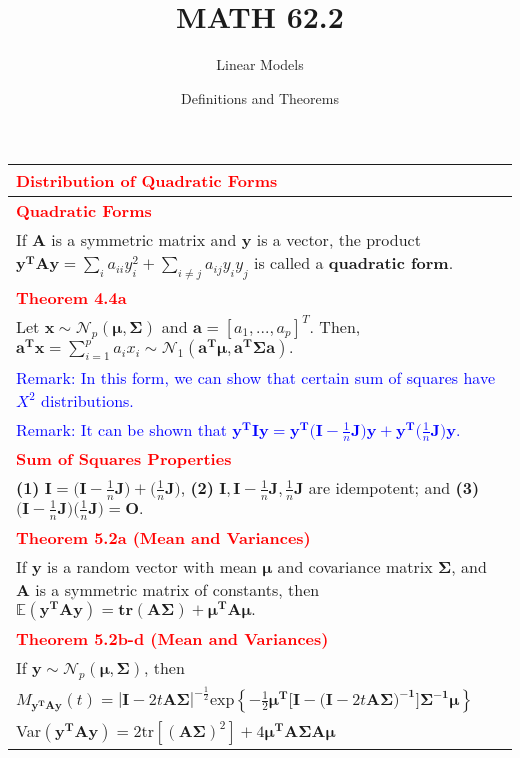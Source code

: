 \documentclass[a4paper,11pt]{article}
\title{MATH 62.2}
\author{Linear Models}
\date{Definitions and Theorems}
\begin{document}
\begin{longtable}{|p{17 cm}|}

\hline
\noindent \textcolor{red}{\textbf{Distribution of Quadratic Forms}} \\
\hline
\textcolor{red}{\textbf{Quadratic Forms}} \\
If $\mathbf{A}$ is a symmetric matrix and $\mathbf{y}$ is a vector, the product $\mathbf{y^TAy}=\sum_i{a_{ii}y_i^2}+\sum_{i\neq j}a_{ij}y_iy_j$ is called a \textbf{quadratic form}. \\
\hline
\textcolor{red}{\textbf{Theorem 4.4a}}\\
Let $\mathbf{x}\sim \mathcal{N}_p(\boldsymbol{\mu}, \boldsymbol{\Sigma})$ and $\mathbf{a}=[a_1,...,a_p]^T$. Then, $\mathbf{a^Tx}=\sum^{p}_{i=1}{a_ix_i}\sim \mathcal{N}_1(\mathbf{a^T\boldsymbol{\mu},a^T\boldsymbol{\Sigma}a}).$ \\
\textcolor{blue}{Remark: In this form, we can show that certain sum of squares have $X^2$ distributions.}  \\
\textcolor{blue}{Remark: It can be shown that $\mathbf{y^TIy=y^T(I-}\frac{1}{n}\mathbf{J)y+y^T(}\frac{1}{n}\mathbf{J)y}.$}\\
\hline
\textcolor{red}{\textbf{Sum of Squares Properties}}\\
\textbf{(1)} $\mathbf{I=(I-}\frac{1}{n}\mathbf{J)+(}\frac{1}{n}\mathbf{J)}$, \textbf{(2)} $\mathbf{I, I-}\frac{1}{n}\mathbf{J,}\frac{1}{n}\mathbf{J}$ are idempotent; and \textbf{(3)} $\mathbf{(I-}\frac{1}{n}\mathbf{J)(}\frac{1}{n}\mathbf{J)=O}.$ \\
\hline
\textcolor{red}{\textbf{Theorem 5.2a (Mean and Variances)}} \\
If $\mathbf{y}$ is a random vector with mean $\boldsymbol{\mu}$ and covariance matrix $\boldsymbol{\Sigma}$, and $\mathbf{A}$ is a symmetric matrix of constants, then $\mathbb{E}\mathbf{(y^TAy)=\text{tr}(A\boldsymbol{\Sigma})+\boldsymbol{\mu}^TA\boldsymbol{\mu}}.$\\
\hline
\textcolor{red}{\textbf{Theorem 5.2b-d (Mean and Variances)}}\\
If $\textbf{y}\sim \mathcal{N}_p(\boldsymbol{\mu},\boldsymbol{\Sigma})$, then \\
\indent $M_{\mathbf{y^TAy}}(t)=|\mathbf{I}-2t\mathbf{A\boldsymbol{\Sigma}}|^{-\frac{1}{2}}\text{exp} \left\{ -\frac{1}{2}\boldsymbol{\mu}\mathbf{^T[I-(I-}2t\mathbf{A\boldsymbol{\Sigma})^{-1}]}\boldsymbol{\Sigma^{-1}\mu}\right\}$\\
\indent Var$\mathbf{(y^TAy)}=2\text{tr} [(\boldsymbol{A\Sigma})^2]+4\boldsymbol{\mu^TA\Sigma A\mu}$\\

\end{longtable}
\end{document}
